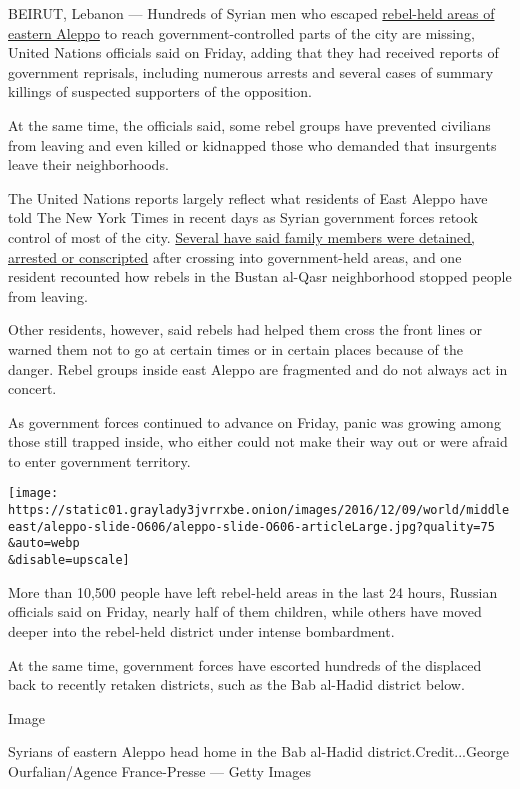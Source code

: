 BEIRUT, Lebanon --- Hundreds of Syrian men who escaped
\href{http://www.nytimes3xbfgragh.onion/2016/12/08/world/middleeast/syria-aleppo-rebels-russia-lavrov-assad.html?ref=world}{rebel-held
areas of eastern Aleppo} to reach government-controlled parts of the
city are missing, United Nations officials said on Friday, adding that
they had received reports of government reprisals, including numerous
arrests and several cases of summary killings of suspected supporters of
the opposition.

At the same time, the officials said, some rebel groups have prevented
civilians from leaving and even killed or kidnapped those who demanded
that insurgents leave their neighborhoods.

The United Nations reports largely reflect what residents of East Aleppo
have told The New York Times in recent days as Syrian government forces
retook control of most of the city.
\href{http://www.nytimes3xbfgragh.onion/2016/12/07/world/middleeast/syria-aleppo.html}{Several
have said family members were detained, arrested or conscripted} after
crossing into government-held areas, and one resident recounted how
rebels in the Bustan al-Qasr neighborhood stopped people from leaving.

Other residents, however, said rebels had helped them cross the front
lines or warned them not to go at certain times or in certain places
because of the danger. Rebel groups inside east Aleppo are fragmented
and do not always act in concert.

As government forces continued to advance on Friday, panic was growing
among those still trapped inside, who either could not make their way
out or were afraid to enter government territory.

\texttt{[image: https://static01.graylady3jvrrxbe.onion/images/2016/12/09/world/middleeast/aleppo-slide-O606/aleppo-slide-O606-articleLarge.jpg?quality=75\\\&auto=webp\\\&disable=upscale]}

More than 10,500 people have left rebel-held areas in the last 24 hours,
Russian officials said on Friday, nearly half of them children, while
others have moved deeper into the rebel-held district under intense
bombardment.

At the same time, government forces have escorted hundreds of the
displaced back to recently retaken districts, such as the Bab al-Hadid
district below.

Image

Syrians of eastern Aleppo head home in the Bab al-Hadid
district.Credit...George Ourfalian/Agence France-Presse --- Getty Images

